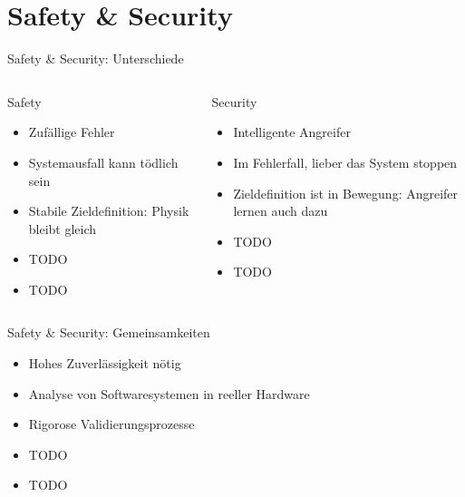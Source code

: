 \section{Safety \& Security}

\begin{frame}[T]{Safety \& Security: Unterschiede}
\small
  \begin{columns}[t,fullwidth]
   \hfill
    \begin{column}{.45\linewidth}
      \begin{block}{Safety}
      \begin{itemize}
        \item Zufällige Fehler
        \item Systemausfall kann tödlich sein
        \item Stabile Zieldefinition: Physik bleibt gleich
        \item TODO
        \item TODO
      \end{itemize}
      \end{block}
    \end{column}
    \hfill
    \begin{column}{.45\linewidth}
      \begin{block}{Security}
      \begin{itemize}
        \item Intelligente Angreifer
        \item Im Fehlerfall, lieber das System stoppen
        \item Zieldefinition ist in Bewegung: Angreifer lernen auch dazu
        \item TODO
        \item TODO
      \end{itemize}
      \end{block}
    \end{column}
    \hfill
  \end{columns}
\end{frame}


\begin{frame}[T]{Safety \& Security: Gemeinsamkeiten}
  \begin{itemize}
    \item Hohes Zuverlässigkeit nötig
    \item Analyse von Softwaresystemen in reeller Hardware
    \item Rigorose Validierungsprozesse
    \item TODO
    \item TODO
  \end{itemize}
\end{frame}


